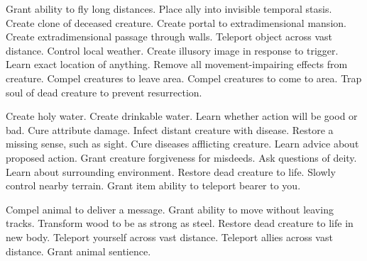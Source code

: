     {Grant ability to fly long distances.}
    {Place ally into invisible temporal stasis.}
    {Create clone of deceased creature.}
    {Create portal to extradimensional mansion.}
    {Create extradimensional passage through walls.}
    {Teleport object across vast distance.}
    {Control local weather.}
    {Create illusory image in response to trigger.}
    {Learn exact location of anything.}
    {Remove all movement-impairing effects from creature.}
    {Compel creatures to leave area.}
    {Compel creatures to come to area.}
    {Trap soul of dead creature to prevent resurrection.}

    {Create holy water.}
    {Create drinkable water.}
    {Learn whether action will be good or bad.}
    {Cure attribute damage.}
    {Infect distant creature with disease.}
    {Restore a missing sense, such as sight.}
    {Cure diseases afflicting creature.}
    {Learn advice about proposed action.}
    {Grant creature forgiveness for misdeeds.}
    {Ask questions of deity.}
    {Learn about surrounding environment.}
    {Restore dead creature to life.}
    {Slowly control nearby terrain.}
    {Grant item ability to teleport bearer to you.}

    {Compel animal to deliver a message.}
    {Grant ability to move without leaving tracks.}
    {Transform wood to be as strong as steel.}
    {Restore dead creature to life in new body.}
    {Teleport yourself across vast distance.}
    {Teleport allies across vast distance.}
    {Grant animal sentience.}
